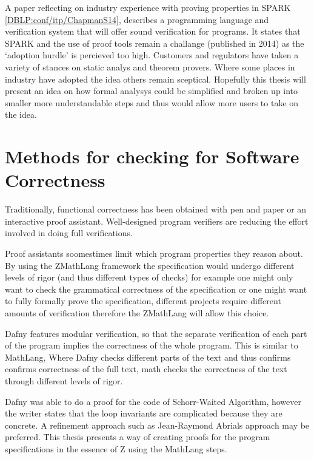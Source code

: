 A paper reflecting on industry experience with proving properties in SPARK \ref{DBLP:conf/itp/ChapmanS14}, describes a programming language and verification system that will offer sound verification for programs. It states that SPARK and the use of proof tools remain a challange (published in 2014) as the `adoption hurdle' is percieved too high. Customers and regulators have taken a variety of stances on static analys and theorem provers. Where some places in industry have adopted the idea others remain sceptical. Hopefully this thesis will present an idea on how formal analysys could be simplified and broken up into smaller more understandable steps and thus would allow more users to take on the idea.

\section{Methods for checking for Software Correctness}

Traditionally, functional correctness has been obtained with pen and paper or an interactive proof assistant. Well-designed program verifiers are reducing the effort involved in doing full verifications.

Proof assistants soomestimes limit which program properties they reason about. By using the ZMathLang framework the specification would undergo different levels of rigor (and thus different types of checks) for example one might only want to check the grammatical correctness of the specification or one might want to fully formally prove the specification, different projects require different amounts of verification therefore the ZMathLang will allow this choice.

Dafny \cite{dafny} features modular verification, so that the separate verification of each part of the program implies the correctness of the whole program. This is similar to MathLang, Where Dafny checks different parts of the text and thus confirms confirms correctness of the full text, \gls{math} checks the correctness of the text through different levels of rigor.

Dafny was able to do a proof for the code of Schorr-Waited Algorithm, however the writer states that the loop invariants are complicated because they are concrete. A refinement approach such as Jean-Raymond Abrials approach \cite{abrial} may be preferred. This thesis presents a way of creating proofs for the program specifications in the essence of Z \cite{essenceofz} using the MathLang steps.  

